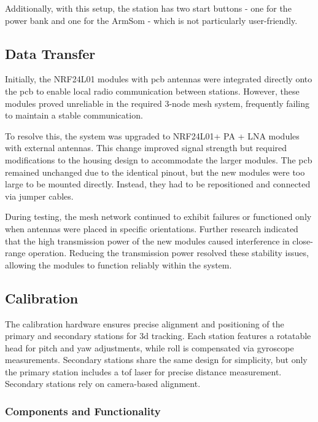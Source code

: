 Additionally, with this setup, the station has two start buttons - one for the power bank and one for the ArmSom - which is not particularly user-friendly.

\subsection{Data Transfer}

Initially, the NRF24L01 \cite{nRF24L01} modules with \acrshort{pcb} antennas were integrated directly onto the \acrshort{pcb} to enable local radio communication between stations. However, these modules proved unreliable in the required 3-node mesh system, frequently failing to maintain a stable communication.

To resolve this, the system was upgraded to NRF24L01+ PA + LNA \cite{nRF24L01_plus} modules with external antennas. This change improved signal strength but required modifications to the housing design to accommodate the larger modules. The \acrshort{pcb} remained unchanged due to the identical pinout, but the new modules were too large to be mounted directly. Instead, they had to be repositioned and connected via jumper cables.

During testing, the mesh network continued to exhibit failures or functioned only when antennas were placed in specific orientations. Further research indicated that the high transmission power of the new modules caused interference in close-range operation. Reducing the transmission power resolved these stability issues, allowing the modules to function reliably within the system.


\subsection{Calibration}

The calibration hardware ensures precise alignment and positioning of the primary and secondary stations for \acrshort{3d} tracking. Each station features a rotatable head for pitch and yaw adjustments, while roll is compensated via gyroscope measurements. Secondary stations share the same design for simplicity, but only the primary station includes a \acrshort{tof} laser for precise distance measurement. Secondary stations rely on camera-based alignment.

\subsubsection*{Components and Functionality}

